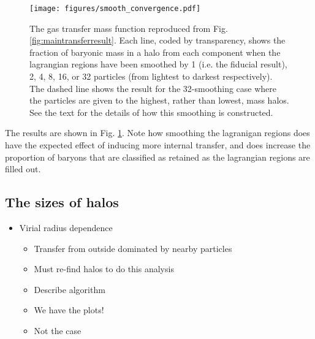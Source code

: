 \begin{figure}
	\centering
	\texttt{[image: figures/smooth\_convergence.pdf]}
	\vspace{-0.7cm}
	\caption{The gas transfer mass function reproduced from Fig.
		\ref{fig:maintransferresult}. Each line, coded by transparency,
		shows the fraction of baryonic mass in a halo from each component
		when the lagrangian regions have been smoothed by 1 (i.e. the fiducial result), 2, 4, 8, 16,
		or 32 particles (from lightest to darkest respectively). The dashed
		line shows the result for the 32-smoothing case where the particles are
		given to the highest, rather than lowest, mass halos. See the
		text for the details of how this smoothing is constructed.
	}
	\label{fig:smoothconv}
\end{figure}

The results are shown in Fig. \ref{fig:smoothconv}. Note how smoothing the
lagranigan regions does have the expected effect of inducing more internal
transfer, and does increase the proportion of baryons that are classified
as retained as the lagrangian regions are filled out.

\subsection{The sizes of halos}


\begin{itemize}
	\item Virial radius dependence
		\begin{itemize}
			\item Transfer from outside dominated by nearby particles
			\item Must re-find halos to do this analysis
			\item Describe algorithm
			\item We have the plots!
			\item Not the case
		\end{itemize}
\end{itemize}
